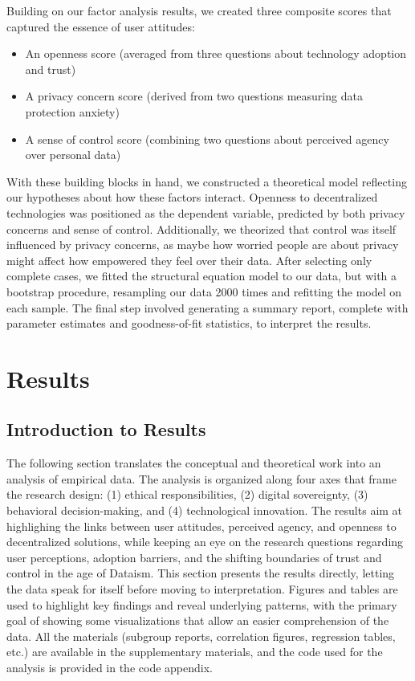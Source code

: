 	Building on our factor analysis results, we created three composite scores that captured the essence of user attitudes:
	\begin{itemize}
		\item An openness score (averaged from three questions about technology adoption and trust)
		\item A privacy concern score (derived from two questions measuring data protection anxiety)
		\item A sense of control score (combining two questions about perceived agency over personal data)
	\end{itemize}
	With these building blocks in hand, we constructed a theoretical model reflecting our hypotheses about how these factors interact. Openness to decentralized technologies was positioned as the dependent variable, predicted by both privacy concerns and sense of control. Additionally, we theorized that control was itself influenced by privacy concerns, as maybe how worried people are about privacy might affect how empowered they feel over their data.
	After selecting only complete cases, we fitted the structural equation model to our data, but with a bootstrap procedure, resampling our data 2000 times and refitting the model on each sample. The final step involved generating a summary report, complete with parameter estimates and goodness-of-fit statistics, to interpret the results.

\section{Results}
\subsection{Introduction to Results}
The following section translates the conceptual and theoretical work into an analysis of empirical data. The analysis is organized along four axes that frame the research design: (1) ethical responsibilities, (2) digital sovereignty, (3) behavioral decision-making, and (4) technological innovation. The results aim at highlighing the links between user attitudes, perceived agency, and openness to decentralized solutions, while keeping an eye on the research questions regarding user perceptions, adoption barriers, and the shifting boundaries of trust and control in the age of Dataism. This section presents the results directly, letting the data speak for itself before moving to interpretation. Figures and tables are used to highlight key findings and reveal underlying patterns, with the primary goal of showing some visualizations that allow an easier comprehension of the data. All the materials (subgroup reports, correlation figures, regression tables, etc.) are available in the supplementary materials, and the code used for the analysis is provided in the code appendix.

